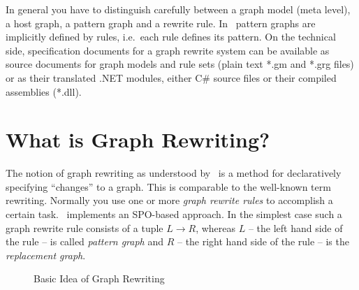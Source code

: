 In general you have to distinguish carefully between a graph model (meta level), a host graph, a pattern graph and a rewrite rule.
In \GrG\ pattern graphs are implicitly defined by rules, i.e.\ each rule defines its pattern.
On the technical side, specification documents for a graph rewrite system can be available as source documents for graph models and rule sets (plain text *.gm and *.grg files) or as their translated .NET modules, either C\# source files or their compiled assemblies (*.dll).


\section{What is Graph Rewriting?}

The notion of graph rewriting as understood by \GrG\ is a method for declaratively specifying ``changes'' to a graph.
This is comparable to the well-known term rewriting. 
Normally you use one or more \emph{graph rewrite rules} to accomplish a certain task.
\GrG\ implements an SPO-based approach.
In the simplest case such a graph rewrite rule consists of a tuple $L \rightarrow R$, whereas $L$ -- the left hand side of the rule -- is called \emph{pattern graph} and $R$ -- the right hand side of the rule -- is the \emph{replacement graph}.

\begin{figure}[htbp]
	\centering
  \caption{Basic Idea of Graph Rewriting}
  \label{figrule}
\end{figure}

